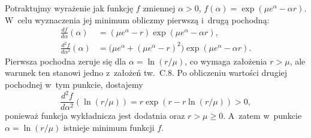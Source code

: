 \exercise %
Potraktujmy wyrażenie jak funkcję $f$ zmiennej $\alpha>0$, $f(\alpha)=\exp(\mu e^\alpha-\alpha r).$ W~celu wyznaczenia jej minimum obliczmy pierwszą i~drugą pochodną:
\begin{align*}
	\frac{df}{d\alpha}(\alpha) &= (\mu e^\alpha-r)\exp(\mu e^\alpha-\alpha r), \\
	\frac{d^2\!f}{d\alpha^2}(\alpha) &= \bigl(\mu e^\alpha+(\mu e^\alpha-r)^2\bigr)\exp(\mu e^\alpha-\alpha r).
\end{align*}
Pierwsza pochodna zeruje się dla $\alpha=\ln(r/\mu)$, co wymaga założenia $r>\mu$, ale warunek ten stanowi jedno z~założeń tw.\ C.8.
Po obliczeniu wartości drugiej pochodnej w~tym punkcie, dostajemy
\[
	\frac{d^2\!f}{d\alpha^2}(\ln(r/\mu)) = r\exp(r-r\ln(r/\mu)) > 0,
\]
ponieważ funkcja wykładnicza jest dodatnia oraz $r>\mu\ge0$.
A~zatem w~punkcie $\alpha=\ln(r/\mu)$ istnieje minimum funkcji $f$.
